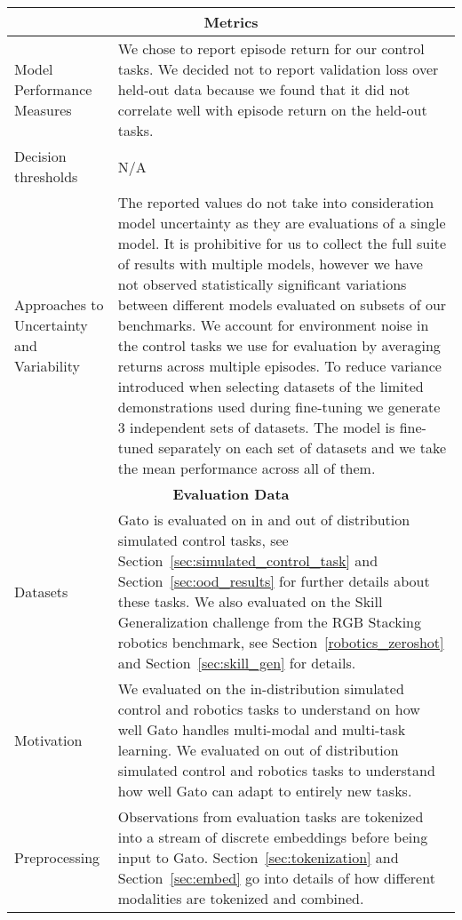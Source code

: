 \documentclass[10pt]{article} \usepackage[accepted]{tmlr}
\newcommand{\model}{{Gato}}
\begin{document}
\begin{longtable}{p{}|p{}}
\toprule
\multicolumn{2}{c}{\textbf{Metrics}}\\
\midrule
Model Performance Measures & We chose to report episode return for our control tasks.
We decided not to report validation loss over held-out data because we found that it did not correlate well with episode return
on the held-out tasks.\\
\midrule
Decision thresholds                       & N/A \\
\midrule
Approaches to Uncertainty and Variability & The reported values do not take into consideration model uncertainty as they are evaluations of a single model.
It is prohibitive for us to collect the full suite of results with multiple models, however we have not observed statistically significant
variations between different models evaluated on subsets of our benchmarks. 
We account for environment noise in the control tasks we use for evaluation by averaging returns across multiple episodes.
To reduce variance introduced when selecting datasets of the limited demonstrations used during fine-tuning
we generate 3 independent sets of datasets.
The model is fine-tuned separately on each set of datasets and we take the mean performance across all of them. \\

\toprule
\multicolumn{2}{c}{\textbf{Evaluation Data}}\\
\midrule
Datasets      & \model{} is evaluated on in and out of distribution simulated control tasks,
see Section~\ref{sec:simulated_control_task} and Section~\ref{sec:ood_results} for further details about these tasks.
We also evaluated on the Skill Generalization challenge from the RGB Stacking robotics benchmark,
see Section~\ref{robotics_zeroshot} and Section~\ref{sec:skill_gen} for details. \\
\midrule
Motivation    & We evaluated on the in-distribution simulated control and robotics tasks to understand on how well
\model{} handles multi-modal and multi-task learning.
We evaluated on out of distribution simulated control and robotics tasks to understand how well \model{} can adapt to entirely new tasks. \\
\midrule
Preprocessing & Observations from evaluation tasks are tokenized into a stream of discrete embeddings before being input to \model{}. 
Section~\ref{sec:tokenization} and Section~\ref{sec:embed} go into details of how different modalities are tokenized and combined. \\


\end{longtable}
\end{document}
